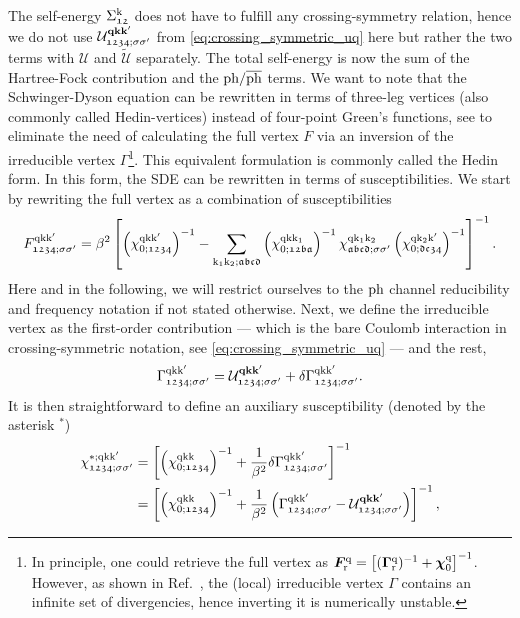\documentclass[../../main.tex]{subfiles}
\begin{document}
The self-energy $\Sigma^{\text{k}}_{\mathfrak{12}}$ does not have to fulfill any crossing-symmetry relation, hence we do not use $\mathcal{U}^{\textbf{qkk}'}_{\mathfrak{1234};\sigma\sigma'}$ from \eqref{eq:crossing_symmetric_uq} here but rather the two terms with $\mathcal{U}$ and $\tilde{\mathcal{U}}$ separately. The total self-energy is now the sum of the Hartree-Fock contribution and the $\text{ph}/\overline{\text{ph}}$ terms. We want to note that the Schwinger-Dyson equation can be rewritten in terms of three-leg vertices (also commonly called Hedin-vertices) instead of four-point Green's functions, see \cite{Hedin1965, Krien2019} to eliminate the need of calculating the full vertex $F$ via an inversion of the irreducible vertex $\Gamma$\footnote{In principle, one could retrieve the full vertex as $\bm F_{\text{r}}^{\text{q}}=\left [(\bm\Gamma_{\text{r}}^{\text{q}})^{-1}+\bm\chi_{0}^{\text{q}}\right ]^{-1}$. However, as shown in Ref.~\cite{Schafer2016a}, the (local) irreducible vertex $\Gamma$ contains an infinite set of divergencies, hence inverting it is numerically unstable.}. This equivalent formulation is commonly called the Hedin form. In this form, the SDE can be rewritten in terms of susceptibilities. We start by rewriting the full vertex as a combination of susceptibilities
\begin{align}
	F^{\text{q}\text{k}\text{k}'}_{\mathfrak{1234};\sigma\sigma'}=\beta^2\left [\left (\chi_{0;\mathfrak{1234}}^{\text{q}\text{k}\text{k}'}\right )^{-1}-\sum_{\text{k}_1\text{k}_2;\mathfrak{abcd}}\left (\chi_{0;\mathfrak{12ba}}^{\text{q}\text{k}\text{k}_1}\right )^{-1} \chi_{\mathfrak{abcd};\sigma\sigma'}^{\text{q}\text{k}_1\text{k}_2} \left (\chi_{0;\mathfrak{dc34}}^{\text{q}\text{k}_2\text{k}'}\right )^{-1}\right ]^{-1}.
\end{align}
Here and in the following, we will restrict ourselves to the $\text{ph}$ channel reducibility and frequency notation if not stated otherwise. Next, we define the irreducible vertex as the first-order contribution --- which is the bare Coulomb interaction in crossing-symmetric notation, see \eqref{eq:crossing_symmetric_uq} --- and the rest,
\begin{align}
	\Gamma_{\mathfrak{1234};\sigma\sigma'}^{\text{q}\text{k}\text{k}'} = \mathcal{U}^{\textbf{qkk}'}_{\mathfrak{1234};\sigma\sigma'}+\delta\Gamma_{\mathfrak{1234};\sigma\sigma'}^{\text{q}\text{k}\text{k}'}.
\end{align}
It is then straightforward to define an auxiliary susceptibility (denoted by the asterisk $^*$)
\begin{align}
\begin{split}\label{eq:chi_aux}
	\chi_{\mathfrak{1234};\sigma\sigma'}^{*;\text{q}\text{k}\text{k}'}&=\left [\left (\chi_{0;\mathfrak{1234}}^{\text{q}\text{k}\text{k}}\right )^{-1}+\frac{1}{\beta^2}\delta\Gamma_{\mathfrak{1234};\sigma\sigma'}^{\text{q}\text{k}\text{k}'}\right ]^{-1}\\
	&=\left [\left (\chi_{0;\mathfrak{1234}}^{\text{q}\text{k}\text{k}}\right )^{-1}+\frac{1}{\beta^2}\left (\Gamma_{\mathfrak{1234};\sigma\sigma'}^{\text{q}\text{k}\text{k}'}-\mathcal{U}^{\textbf{qkk}'}_{\mathfrak{1234};\sigma\sigma'}\right )\right ]^{-1},
\end{split}
\end{align}
\end{document}
